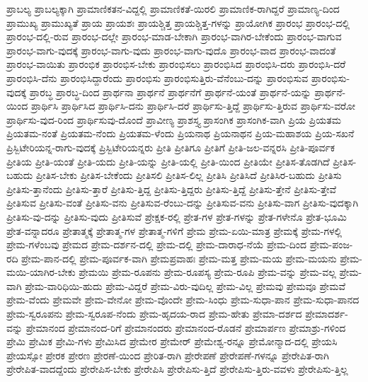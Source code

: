 {ಪ್ರಾಬಲ್ಯ
ಪ್ರಾಬಲ್ಯಕ್ಕಾಗಿ
ಪ್ರಾಮಾಣಿಕತನ-ವಿದ್ದಲ್ಲಿ
ಪ್ರಾಮಾಣಿಕತೆ-ಯಿರಲಿ
ಪ್ರಾಮಾಣಿಕ-ರಾಗಿದ್ದರೆ
ಪ್ರಾಮಾಣ್ಯ-ದಿಂದ
ಪ್ರಾಮುಖ್ಯ
ಪ್ರಾಮುಖ್ಯತೆ
ಪ್ರಾಯ
ಪ್ರಾಯಶಃ
ಪ್ರಾಯಶ್ಚಿತ್ತ
ಪ್ರಾಯಶ್ಚಿತ್ತ-ಗಳನ್ನು
ಪ್ರಾಯೋಗಿಕ
ಪ್ರಾರಂಭ
ಪ್ರಾರಂಭ-ದಲ್ಲಿ
ಪ್ರಾರಂಭ-ದಲ್ಲಿ-ರುವ
ಪ್ರಾರಂಭ-ದಲ್ಲೇ
ಪ್ರಾರಂಭ-ಮಾಡ-ಬೇಕಾಗಿ
ಪ್ರಾರಂಭ-ವಾಗಿರ-ಬೇಕೆಂದು
ಪ್ರಾರಂಭ-ವಾಗುವ
ಪ್ರಾರಂಭ-ವಾಗು-ವುದಕ್ಕೆ
ಪ್ರಾರಂಭ-ವಾಗು-ವುದು
ಪ್ರಾರಂಭ-ವಾಗು-ವುದೊ
ಪ್ರಾರಂಭ-ವಾದ
ಪ್ರಾರಂಭ-ವಾದಂತೆ
ಪ್ರಾರಂಭ-ವಾಯಿತು
ಪ್ರಾರಂಭಿಕ
ಪ್ರಾರಂಭಿಸ-ಬೇಕು
ಪ್ರಾರಂಭಿಸಲು
ಪ್ರಾರಂಭಿಸಿದ
ಪ್ರಾರಂಭಿಸಿ-ದರು
ಪ್ರಾರಂಭಿಸಿ-ದರೆ
ಪ್ರಾರಂಭಿಸಿ-ದೆನು
ಪ್ರಾರಂಭಿಸಿದ್ದಾರೆಂದು
ಪ್ರಾರಂಭಿಸು
ಪ್ರಾರಂಭಿಸುತ್ತಿರು-ವೆನೆಂಬು-ದನ್ನು
ಪ್ರಾರಂಭಿಸುವ
ಪ್ರಾರಂಭಿಸು-ವುದಕ್ಕೆ
ಪ್ರಾರಬ್ಧ
ಪ್ರಾರಬ್ಧ-ದಿಂದ
ಪ್ರಾರ್ಥನಾ
ಪ್ರಾರ್ಥನೆ
ಪ್ರಾರ್ಥನೆಗೆ
ಪ್ರಾರ್ಥನೆ-ಯಂತೆ
ಪ್ರಾರ್ಥನೆ-ಯನ್ನು
ಪ್ರಾರ್ಥನೆ-ಯಿಂದ
ಪ್ರಾರ್ಥಿಸಿ
ಪ್ರಾರ್ಥಿಸಿದ
ಪ್ರಾರ್ಥಿಸಿ-ದನು
ಪ್ರಾರ್ಥಿಸಿ-ದರೆ
ಪ್ರಾರ್ಥಿಸು-ತ್ತಿದ್ದೆ
ಪ್ರಾರ್ಥಿಸು-ತ್ತಿರುವ
ಪ್ರಾರ್ಥಿಸು-ವರೋ
ಪ್ರಾರ್ಥಿಸು-ವುದ-ರಿಂದ
ಪ್ರಾರ್ಥಿಸುವು-ದೊಂದೆ
ಪ್ರಾವೀಣ್ಯ
ಪ್ರಾಶಸ್ತ್ಯ
ಪ್ರಾಸಂಗಿಕ
ಪ್ರಾಸಂಗಿಕ-ವಾಗಿ
ಪ್ರಿಯ
ಪ್ರಿಯತಮ
ಪ್ರಿಯತಮ-ನಂತೆ
ಪ್ರಿಯತಮ-ನೆಂದು
ಪ್ರಿಯತಮ-ಳೆಂದು
ಪ್ರಿಯನಾಥ
ಪ್ರಿಯನಾಥನ
ಪ್ರಿಯ-ಮಹಾಶಯ
ಪ್ರಿಯ-ಸಖನೆ
ಪ್ರಿಸ್ಬಿಟೇರಿಯನ್ನ-ರಾಗು-ವುದಕ್ಕೆ
ಪ್ರಿಸ್ಬಿಟೇರಿಯನ್ನರು
ಪ್ರೀತಿ
ಪ್ರೀತಿಗೂ
ಪ್ರೀತಿಗೆ
ಪ್ರೀತಿ-ಜಲ-ವನ್ನರಸಿ
ಪ್ರೀತಿ-ಪೂರ್ವಕ
ಪ್ರೀತಿಯ
ಪ್ರೀತಿ-ಯಂತೆ
ಪ್ರೀತಿ-ಯದು
ಪ್ರೀತಿ-ಯನ್ನು
ಪ್ರೀತಿ-ಯಲ್ಲಿ
ಪ್ರೀತಿ-ಯಿಂದ
ಪ್ರೀತಿಯೇ
ಪ್ರೀತಿಸ-ತೊಡಗಿದೆ
ಪ್ರೀತಿಸ-ಬಹುದು
ಪ್ರೀತಿಸ-ಬೇಕು
ಪ್ರೀತಿಸ-ಬೇಕೆಂದು
ಪ್ರೀತಿಸಲಿ
ಪ್ರೀತಿಸ-ಲಿಲ್ಲ
ಪ್ರೀತಿಸಿ
ಪ್ರೀತಿಸಿದೆ
ಪ್ರೀತಿಸಿರ-ಬಹುದು
ಪ್ರೀತಿಸು
ಪ್ರೀತಿಸು-ತ್ತಾನೆಂದು
ಪ್ರೀತಿಸು-ತ್ತಾರೆ
ಪ್ರೀತಿಸು-ತ್ತಿದ್ದ
ಪ್ರೀತಿಸು-ತ್ತಿದ್ದರು
ಪ್ರೀತಿಸು-ತ್ತಿದ್ದೆ
ಪ್ರೀತಿಸು-ತ್ತೇನೆ
ಪ್ರೀತಿಸು-ತ್ತೇವೆ
ಪ್ರೀತಿಸುವ
ಪ್ರೀತಿಸು-ವಂತೆ
ಪ್ರೀತಿಸು-ವನು
ಪ್ರೀತಿಸುವ-ರೆಂಬು-ದನ್ನು
ಪ್ರೀತಿಸುವ-ವನು
ಪ್ರೀತಿಸು-ವಾಗ
ಪ್ರೀತಿಸು-ವುದಕ್ಕಾಗಿ
ಪ್ರೀತಿಸು-ವು-ದನ್ನು
ಪ್ರೀತಿಸು-ವುದು
ಪ್ರೀತಿಸುವೆ
ಪ್ರೇಕ್ಷಕ-ರಲ್ಲಿ
ಪ್ರೇತ-ಗಳ
ಪ್ರೇತ-ಗಳನ್ನು
ಪ್ರೇತ-ಗಳೇನೊ
ಪ್ರೇತ-ಭೂಮಿ
ಪ್ರೇತ-ವನ್ನಾದರೂ
ಪ್ರೇತಾತ್ಮಕ್ಕೆ
ಪ್ರೇತಾತ್ಮ-ಗಳ
ಪ್ರೇತಾತ್ಮ-ಗಳಿಗೆ
ಪ್ರೇಮ
ಪ್ರೇಮ-ಏಯಿ-ಮಾತ್ರ
ಪ್ರೇಮಕ್ಕೆ
ಪ್ರೇಮ-ಗಳಲ್ಲಿ
ಪ್ರೇಮ-ಗಳೆಂಬವು
ಪ್ರೇಮದ
ಪ್ರೇಮ-ದರ್ಶನ-ದಲ್ಲಿ
ಪ್ರೇಮ-ದಲ್ಲಿ
ಪ್ರೇಮ-ದಾರಾಧ-ನೆಯೆ
ಪ್ರೇಮ-ದಿಂದ
ಪ್ರೇಮ-ಪಂಜ-ರದಿ
ಪ್ರೇಮ-ಪಾನ-ದಲ್ಲಿ
ಪ್ರೇಮ-ಪೂರ್ವಕ-ವಾಗಿ
ಪ್ರೇಮಪ್ರವಾಹಃ
ಪ್ರೇಮ-ಮತ್ತ
ಪ್ರೇಮ-ಮಯ
ಪ್ರೇಮ-ಮಯನು
ಪ್ರೇಮ-ಮಯಿ-ಯಾಗಿರ-ಬೇಕು
ಪ್ರೇಮಯಿ
ಪ್ರೇಮ-ರೂಪನು
ಪ್ರೇಮ-ರೂಪಸ್ಯ
ಪ್ರೇಮ-ರೂಪಿ
ಪ್ರೇಮ-ವನ್ನು
ಪ್ರೇಮ-ವಲ್ಲ
ಪ್ರೇಮ-ವಾಗಿ
ಪ್ರೇಮ-ವಾರಿಧಿಯಿ-ಹುದು
ಪ್ರೇಮ-ವಿದ್ದರೆ
ಪ್ರೇಮ-ವಿರು-ವುದಿಲ್ಲ
ಪ್ರೇಮ-ವಿಲ್ಲ
ಪ್ರೇಮವು
ಪ್ರೇಮವೂ
ಪ್ರೇಮವೆ
ಪ್ರೇಮ-ವೆಂದು
ಪ್ರೇಮವೇ
ಪ್ರೇಮ-ವೇನೋ
ಪ್ರೇಮ-ವೊಂದೇ
ಪ್ರೇಮ-ಸಿಂಧು
ಪ್ರೇಮ-ಸುಧಾ-ಪಾನ
ಪ್ರೇಮ-ಸುಧಾ-ಪಾನದ
ಪ್ರೇಮ-ಸ್ವರೂಪನು
ಪ್ರೇಮ-ಸ್ವರೂಪ-ನೆಂದು
ಪ್ರೇಮ-ಹೃದಯ-ರಾದ
ಪ್ರೇಮ-ಹೇತು
ಪ್ರೇಮಾ-ದರ್ಶದ
ಪ್ರೇಮಾದರ್ಶ-ವನ್ನು
ಪ್ರೇಮಾನಂದ
ಪ್ರೇಮಾನಂದ-ರಿಗೆ
ಪ್ರೇಮಾನಂದರು
ಪ್ರೇಮಾನಂದ-ರೊಡನೆ
ಪ್ರೇಮಾರ್ಪಣ
ಪ್ರೇಮಾಶ್ರು-ಗಳಿಂದ
ಪ್ರೇಮಿ
ಪ್ರೇಮಿಕ
ಪ್ರೇಮಿ-ಗಳು
ಪ್ರೇಮಿಸಿದ
ಪ್ರೇಮೇರ
ಪ್ರೇಮೇರ್
ಪ್ರೇಮೇಶ್ವ-ರನ್ನೂ
ಪ್ರೇಮೋನ್ಮಾದ-ದಲ್ಲಿ
ಪ್ರೇಯಸಿ
ಪ್ರೇಯಸ್ಸೋ
ಪ್ರೇರಕ
ಪ್ರೇರಣ
ಪ್ರೇರಣೆ-ಯಿಂದ
ಪ್ರೇರಿತ-ರಾಗಿ
ಪ್ರೇರೇಪಣೆ
ಪ್ರೇರೇಪಣೆ-ಗಳನ್ನೂ
ಪ್ರೇರೇಪಿತ-ರಾಗಿ
ಪ್ರೇರೇಪಿತ-ವಾದದ್ದೆಂದು
ಪ್ರೇರೇಪಿಸ-ಬೇಕು
ಪ್ರೇರೇಪಿಸಿ
ಪ್ರೇರೇಪಿಸು-ತ್ತಿದೆ
ಪ್ರೇರೇಪಿಸು-ತ್ತಿರು-ವವಳು
ಪ್ರೇರೇಪಿಸು-ತ್ತಿಲ್ಲ
}
